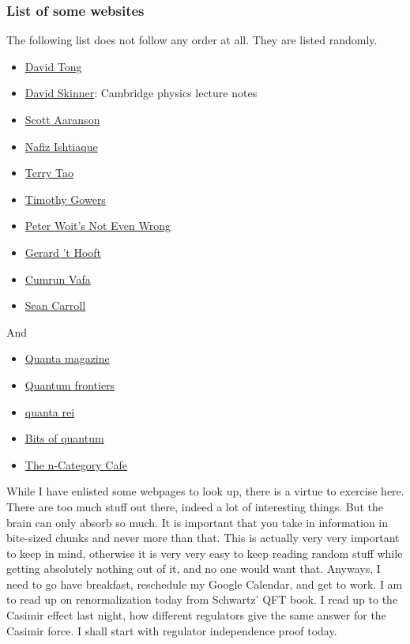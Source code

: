 \documentclass[11pt,a4paper]{article}
\begin{document}
\subsubsection{List of some websites}
The following list does not follow any order at all. They are listed randomly.
\begin{itemize}
	\item \href{https://www.damtp.cam.ac.uk/user/tong/}{David Tong}
	\item \href{https://www.damtp.cam.ac.uk/user/dbs26/teaching.html}{David Skinner}: Cambridge physics lecture notes
	\item \href{https://scottaaronson.blog/}{Scott Aaranson}
	\item \href{https://nafizishtiaque.com/?i=1}{Nafiz Ishtiaque}
	\item \href{https://terrytao.wordpress.com/}{Terry Tao}
	\item \href{https://www.dpmms.cam.ac.uk/~wtg10/}{Timothy Gowers}
	\item \href{https://www.math.columbia.edu/~woit/wordpress/}{Peter Woit's Not Even Wrong}
	\item \href{https://webspace.science.uu.nl/~hooft101/}{Gerard 't Hooft}
	\item \href{https://www.cumrunvafa.org/}{Cumrun Vafa}
	\item \href{https://www.preposterousuniverse.com/blog/}{Sean Carroll}
\end{itemize}
And 
\begin{itemize}
	\item \href{https://www.quantamagazine.org/}{Quanta magazine}
	\item \href{https://quantumfrontiers.com/}{Quantum frontiers}
	\item \href{https://quantarei.wordpress.com/}{quanta rei}
	\item \href{https://blog.qutech.nl/}{Bits of quantum}
	\item \href{https://golem.ph.utexas.edu/category/}{The n-Category Cafe}
\end{itemize}
While I have enlisted some webpages to look up, there is a virtue to exercise here. There are too much stuff out there, indeed a lot of interesting things. But the brain can only absorb so much. It is important that you take in information in bite-sized chunks and never more than that. This is actually very very important to keep in mind, otherwise it is very very easy to keep reading random stuff while getting absolutely nothing out of it, and no one would want that. Anyways, I need to go have breakfast, reschedule my Google Calendar, and get to work. I am to read up on renormalization today from Schwartz' QFT book. I read up to the Casimir effect last night, how different regulators give the same answer for the Casimir force. I shall start with regulator independence proof today. 
\end{document}
